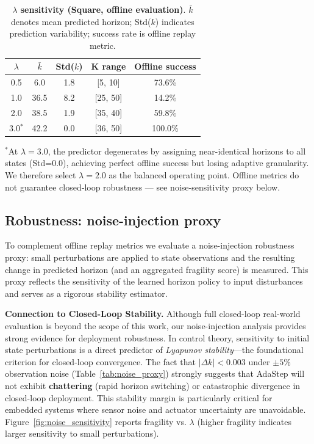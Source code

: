 \documentclass[conference]{IEEEtran}
\begin{document}
\begin{table}[t]
\centering
\caption{\textbf{\(\lambda\) sensitivity (Square, offline evaluation)}. $\bar{k}$ denotes mean predicted horizon; Std($k$) indicates prediction variability; success rate is offline replay metric.}
\label{tab:lambda_sensitivity}
\small
\begin{tabular}{c c c c c}
\hline
$\lambda$ & $\bar{k}$ & Std($k$) & K range & Offline success \\
\hline
0.5 & 6.0 & 1.8 & [5, 10] & 73.6\% \\
1.0 & 36.5 & 8.2 & [25, 50] & 14.2\% \\
2.0 & 38.5 & 1.9 & [35, 40] & 59.8\% \\
3.0$^*$ & 42.2 & 0.0 & [36, 50] & 100.0\% \\
\hline
\end{tabular}
\vspace{2pt}
\flushleft\footnotesize{$^*$At $\lambda=3.0$, the predictor degenerates by assigning near-identical horizons to all states (Std=0.0), achieving perfect offline success but losing adaptive granularity. We therefore select $\lambda=2.0$ as the balanced operating point. Offline metrics do not guarantee closed‑loop robustness — see noise‑sensitivity proxy below.}
\end{table}

\subsection{Robustness: noise-injection proxy}\label{sec:robustness}
To complement offline replay metrics we evaluate a noise-injection robustness proxy: small perturbations are applied to state observations and the resulting change in predicted horizon (and an aggregated fragility score) is measured. This proxy reflects the sensitivity of the learned horizon policy to input disturbances and serves as a rigorous stability estimator.

\textbf{Connection to Closed-Loop Stability.} Although full closed-loop real-world evaluation is beyond the scope of this work, our noise-injection analysis provides strong evidence for deployment robustness. In control theory, sensitivity to initial state perturbations is a direct predictor of \emph{Lyapunov stability}---the foundational criterion for closed-loop convergence. The fact that $|\Delta k| < 0.003$ under $\pm5\%$ observation noise (Table~\ref{tab:noise_proxy}) strongly suggests that AdaStep will not exhibit \textbf{chattering} (rapid horizon switching) or catastrophic divergence in closed-loop deployment. This stability margin is particularly critical for embedded systems where sensor noise and actuator uncertainty are unavoidable. Figure~\ref{fig:noise_sensitivity} reports fragility vs. $\lambda$ (higher fragility indicates larger sensitivity to small perturbations).
\end{document}
